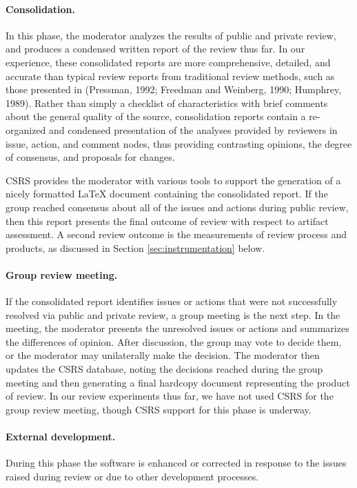 \paragraph{Consolidation.} In this phase, the moderator analyzes the results of
public and private review, and produces a condensed written report of the
review thus far.  In our experience, these consolidated reports are
more comprehensive, detailed, and accurate than typical review reports
from traditional review methods, such as those presented in (Pressman,
1992; Freedman and Weinberg, 1990; Humphrey, 1989).  Rather than simply a
checklist of characteristics with brief comments about the general quality
of the source, consolidation reports contain a re-organized and condensed
presentation of the analyses provided by reviewers in issue, action, and
comment nodes, thus providing contrasting opinions, the degree of consensus,
and proposals for changes.

CSRS provides the moderator with various tools to support the generation of
a nicely formatted LaTeX document containing
the consolidated report.  If the group reached consensus about all of the
issues and actions during public review, then this report presents the final
outcome of review with respect to artifact assessment.  A second review
outcome is the measurements of review process and products, as discussed
in Section \ref{sec:instrumentation} below.
 
\paragraph {Group review meeting.} If the consolidated report identifies issues or
actions that were not successfully resolved via public and private review,
a group meeting is the next step.  In the meeting, the moderator presents
the unresolved issues or actions and summarizes the differences of opinion.
After discussion, the group may vote to decide them, or the moderator may
unilaterally make the decision. The moderator then updates the CSRS
database, noting the decisions reached during the group meeting and then
generating a final hardcopy document representing the product of review.
In our review experiments thus far, we have not used CSRS for the group
review meeting, though CSRS support for this phase is underway.

\paragraph{External development.}  During this phase the software is
enhanced or corrected in response to the issues raised during review or due
to other development processes. 

